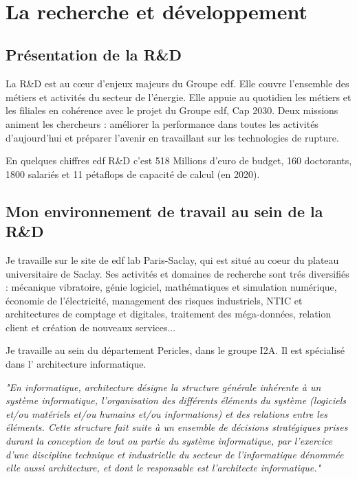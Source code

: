 ~\cite[IRSN]{IRSN_rep_schema}

\justify
\section{La recherche et développement}

\subsection{Présentation de la R\&D}

La R\&D est au cœur d’enjeux majeurs du Groupe \acrshort{edf}. Elle couvre l’ensemble des métiers et activités du secteur de l’énergie. Elle appuie au quotidien les métiers et les filiales en cohérence avec le projet du Groupe \acrshort{edf}, Cap 2030. Deux missions animent les chercheurs : améliorer la performance dans toutes les activités d’aujourd’hui et préparer l’avenir en travaillant sur les technologies de rupture.

En quelques chiffres \acrshort{edf} R\&D c'est 518 Millions d'euro de budget, 160 doctorants, 1800 salariés et 11 pétaflops de capacité de calcul (en 2020).

\subsection{Mon environnement de travail au sein de la R\&D}
Je travaille sur le site de \acrshort{edf} lab Paris-Saclay, qui est situé au coeur du plateau universitaire de Saclay. Ses activités et domaines de recherche sont trés diversifiés : mécanique vibratoire, génie logiciel, mathématiques et simulation numérique, économie de l'électricité, management des risques industriels, NTIC et architectures de comptage et digitales, traitement des méga-données, relation client et création de nouveaux services...

Je travaille au sein du département Pericles, dans le groupe I2A. Il est spécialisé dans l' architecture informatique.

\textit{
 "En informatique, architecture désigne la structure générale inhérente à un système informatique, l'organisation des différents éléments du système (logiciels et/ou matériels et/ou humains et/ou informations) et des relations entre les éléments. Cette structure fait suite à un ensemble de décisions stratégiques prises durant la conception de tout ou partie du système informatique, par l'exercice d'une discipline technique et industrielle du secteur de l'informatique dénommée elle aussi architecture, et dont le responsable est l'architecte informatique."
} \cite{wikipedia_archi_info}

